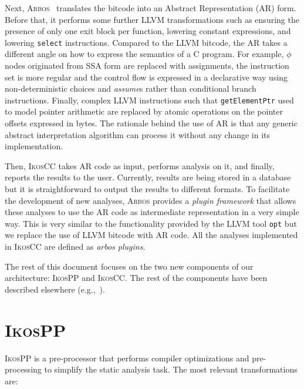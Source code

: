 \documentclass[a4]{article}
\newcommand{\arbos}{\textsc{Arbos}\xspace}
\newcommand{\ikoscc}{\textsc{IkosCC}\xspace}
\newcommand{\ikospp}{\textsc{IkosPP}\xspace}
\begin{document}
Next, \arbos~\cite{ikos} translates the bitcode into an Abstract
Representation (AR) form. Before that, it performs some further LLVM
transformations such as ensuring the presence of only one exit block
per function, lowering constant expressions, and lowering
\texttt{select} instructions.  Compared to the LLVM bitcode, the AR
takes a different angle on how to express the semantics of a C
program.  
%
For example, $\phi$ nodes originated from SSA form are replaced with
assignments, the instruction set is more regular and the control flow
is expressed in a declarative way using non-deterministic choices and
\emph{assume}s rather than conditional branch instructions. Finally,
complex LLVM instructions such that \texttt{getElementPtr} used to
model pointer arithmetic are replaced by atomic operations on the
pointer offsets expressed in bytes.
%
The rationale behind the use of AR is that any generic abstract
interpretation algorithm can process it without any change in its
implementation.

Then, \ikoscc takes AR code as input, performs analysis on it, and
finally, reports the results to the user. Currently, results are being
stored in a database but it is straightforward to output the results
to different formats.
%
To facilitate the development of new analyses, \arbos provides a
\emph{plugin framework} that allows these analyses to use the AR code
as intermediate representation in a very simple way. This is very
similar to the functionality provided by the LLVM tool \texttt{opt}
but we replace the use of LLVM bitcode with AR code. All the analyses
implemented in \ikoscc are defined as \emph{arbos plugins}.

The rest of this document focuses on the two new components of our
architecture: \ikospp and \ikoscc. The rest of the components have
been described elsewhere (e.g.,~\cite{ikos}).

\section{\ikospp}
\label{sec:preprocessor}

\ikospp is a pre-processor that performs compiler optimizations and
pre-processing to simplify the static analysis task. %
The most relevant transformations are:
\end{document}
